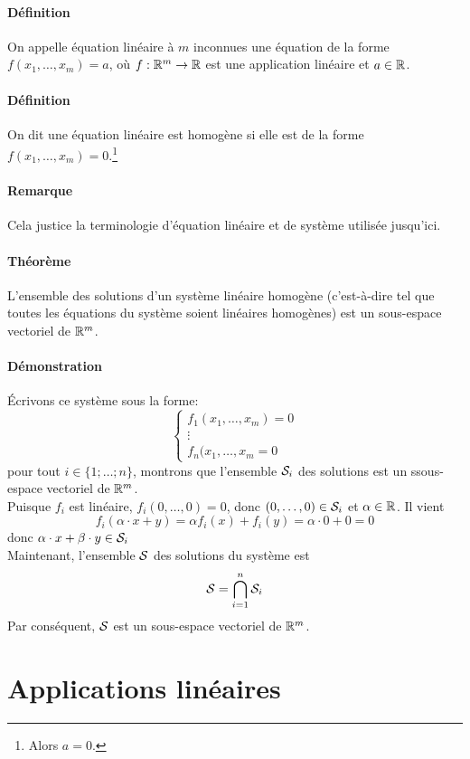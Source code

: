 \paragraph{Définition} On appelle équation linéaire à $m$ inconnues une équation de la forme $f(x_1, \ldots, x_m) = a$, où $f: \mathbb{R}^m \rightarrow \mathbb{R}$ est une application linéaire et $a \in \mathbb{R}$.

\paragraph{Définition} On dit une équation linéaire est homogène si elle est de la forme $f(x_1, \ldots, x_m) = 0$.\footnote{Alors $a = 0$.}

\paragraph{Remarque} Cela justice la terminologie d'équation linéaire et de système utilisée jusqu'ici.

\paragraph{Théorème} L'ensemble des solutions d'un système linéaire homogène (c'est-à-dire tel que toutes les équations du système soient linéaires homogènes) est un sous-espace vectoriel de $\mathbb{R}^m$.
\paragraph{Démonstration} Écrivons ce système sous la forme:
$$ \left\{ \begin{matrix}
  f_1(x_1, \ldots, x_m) = 0\\
  \vdots \\
  f_n(x_1, \ldots, x_m = 0
\end{matrix} \right. $$
pour tout $i \in \{1; \ldots; n\}$, montrons que l'ensemble $\mathcal{S}_i$ des solutions est un ssous-espace vectoriel de $\mathbb{R}^m$. \\
Puisque $f_i$ est linéaire, $f_i(0, \ldots, 0) = 0$, donc $(0,  \ldots, 0) \in \mathcal{S}_i$ et $\alpha \in \mathbb{R}$. Il vient 
$$f_i(\alpha \cdot x + y) = \alpha f_i(x) + f_i(y) = \alpha \cdot 0 
+ 0 = 0$$
donc $\alpha \cdot x + \beta \cdot y \in \mathcal{S}_i$ \\
Maintenant, l'ensemble $\mathcal{S}$ des solutions du système est 
$$\mathcal{S} =  \bigcap_{i=1}^n {\mathcal{S}_i}$$
Par conséquent, $\mathcal{S}$ est un sous-espace vectoriel de $\mathbb{R}^m$.

%
%
\section{Applications linéaires}
%
%
